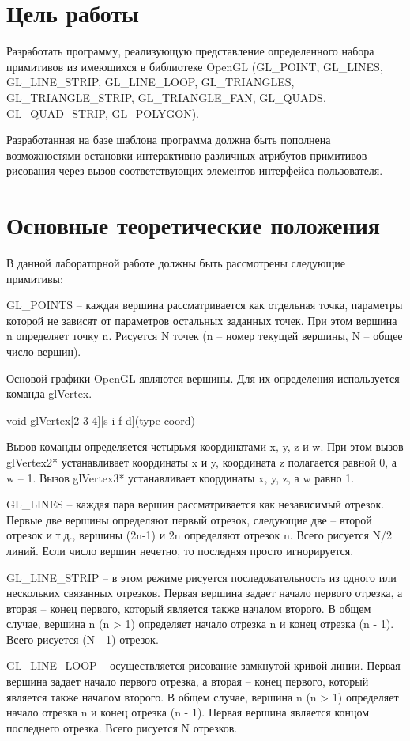 \setcounter{page}{2}
\section*{Цель работы}
Разработать программу, реализующую представление определенного набора примитивов из имеющихся в библиотеке OpenGL (GL\_POINT, GL\_LINES, GL\_LINE\_STRIP, GL\_LINE\_LOOP, GL\_TRIANGLES, GL\_TRIANGLE\_STRIP, GL\_TRIANGLE\_FAN, GL\_QUADS, GL\_QUAD\_STRIP, GL\_POLYGON).

Разработанная на базе шаблона программа должна быть пополнена возможностями остановки интерактивно различных атрибутов примитивов рисования через вызов соответствующих элементов интерфейса пользователя.

\section*{Основные теоретические положения}
В данной лабораторной работе должны быть рассмотрены следующие примитивы:

GL\_POINTS – каждая вершина рассматривается как отдельная точка, параметры которой не зависят от параметров остальных заданных точек.
При этом вершина n определяет точку n.
Рисуется N точек (n – номер текущей вершины, N – общее число вершин).

Основой графики OpenGL являются вершины.
Для их определения используется команда glVertex.

void glVertex[2 3 4][s i f d](type coord)

Вызов команды определяется четырьмя координатами x, y, z и w.
При этом вызов glVertex2* устанавливает координаты x и y, координата z полагается равной 0, а w – 1.
Вызов glVertex3* устанавливает координаты x, y, z, а w равно 1.

GL\_LINES – каждая пара вершин рассматривается как независимый отрезок.
Первые две вершины определяют первый отрезок, следующие две – второй отрезок и т.д., вершины (2n-1) и 2n определяют отрезок n.
Всего рисуется N/2 линий.
Если число вершин нечетно, то последняя просто игнорируется.

GL\_LINE\_STRIP – в этом режиме рисуется последовательность из одного или нескольких связанных отрезков.
Первая вершина задает начало первого отрезка, а вторая – конец первого, который является также началом второго.
В общем случае, вершина n (n > 1) определяет начало отрезка n и конец отрезка (n - 1).
Всего рисуется (N - 1) отрезок.

GL\_LINE\_LOOP – осуществляется рисование замкнутой кривой линии.
Первая вершина задает начало первого отрезка, а вторая – конец первого, который является также началом второго.
В общем случае, вершина n (n > 1) определяет начало отрезка n и конец отрезка (n - 1).
Первая вершина является концом последнего отрезка. Всего рисуется N отрезков.

